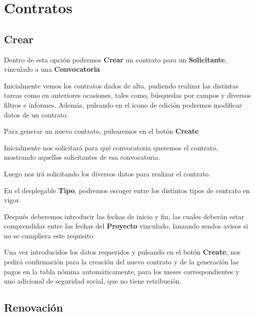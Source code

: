 \section{Contratos}\label{contratos}

\subsection{Crear}\label{crear}

Dentro de esta opción podremos \textbf{Crear} un contrato para un \textbf{Solicitante}, vinculado a una \textbf{Convocatoria}


Inicialmente vemos los contratos dados de alta, pudiendo realizar las distintas tareas como en anteriores ocasiones, tales como, búsquedas por campos y diversos filtros e informes. Además, pulsando en el icono de edición podremos modificar datos de un contrato.

Para generar un nuevo contrato, pulsaremos en el botón \textbf{Create}

Inicialmente nos solicitará para qué convocatoria queremos el contrato, mostrando aquellos solicitantes de esa convocatoria.


Luego nos irá solicitando los diversos datos para realizar el contrato.

En el desplegable \textbf{Tipo}, podremos escoger entre los distintos tipos de contrato en vigor.

Después deberemos introducir las fechas de inicio y fin, las cuales deberán estar comprendidas entre las fechas del \textbf{Proyecto} vinculado, lanzando sendos avisos si no se cumpliera este requisito:


Una vez introducidos los datos requeridos y pulsando en el botón \textbf{Create}, nos pedirá confirmación para la creación del nuevo contrato y de la generación las pagos en la tabla nómina automáticamente, para los meses correspondientes y uno adicional de seguridad social, que no tiene retribución.


\subsection{Renovación}\label{renovacion}

